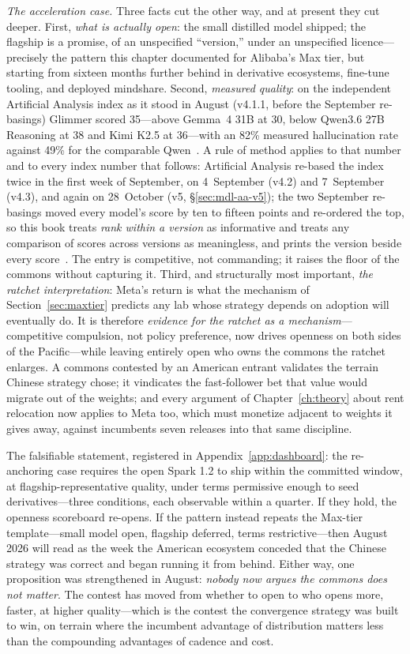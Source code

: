 \emph{The acceleration case.} Three facts cut the other way, and at present they cut deeper. First, \emph{what is actually open}: the small distilled model shipped; the flagship is a promise, of an unspecified ``version,'' under an unspecified licence---precisely the pattern this chapter documented for Alibaba's Max tier, but starting from sixteen months further behind in derivative ecosystems, fine-tune tooling, and deployed mindshare. Second, \emph{measured quality}: on the independent Artificial Analysis index as it stood in August (v4.1.1, before the September re-basings) Glimmer scored 35---above Gemma~4 31B at 30, below Qwen3.6 27B Reasoning at 38 and Kimi K2.5 at 36---with an 82\% measured hallucination rate against 49\% for the comparable Qwen~\cite{muse-aa}. A rule of method applies to that number and to every index number that follows: Artificial Analysis re-based the index twice in the first week of September, on 4~September (v4.2) and 7~September (v4.3), and again on 28~October (v5, \S\ref{sec:mdl-aa-v5}); the two September re-basings moved every model's score by ten to fifteen points and re-ordered the top, so this book treats \emph{rank within a version} as informative and treats any comparison of scores across versions as meaningless, and prints the version beside every score~\cite{aa-v43}. The entry is competitive, not commanding; it raises the floor of the commons without capturing it. Third, and structurally most important, \emph{the ratchet interpretation}: Meta's return is what the mechanism of Section~\ref{sec:maxtier} predicts any lab whose strategy depends on adoption will eventually do. It is therefore \emph{evidence for the ratchet as a mechanism}---competitive compulsion, not policy preference, now drives openness on both sides of the Pacific---while leaving entirely open who owns the commons the ratchet enlarges. A commons contested by an American entrant validates the terrain Chinese strategy chose; it vindicates the fast-follower bet that value would migrate out of the weights; and every argument of Chapter~\ref{ch:theory} about rent relocation now applies to Meta too, which must monetize adjacent to weights it gives away, against incumbents seven releases into that same discipline.

The falsifiable statement, registered in Appendix~\ref{app:dashboard}: the re-anchoring case requires the open Spark 1.2 to ship within the committed window, at flagship-representative quality, under terms permissive enough to seed derivatives---three conditions, each observable within a quarter. If they hold, the openness scoreboard re-opens. If the pattern instead repeats the Max-tier template---small model open, flagship deferred, terms restrictive---then August 2026 will read as the week the American ecosystem conceded that the Chinese strategy was correct and began running it from behind. Either way, one proposition was strengthened in August: \emph{nobody now argues the commons does not matter}. The contest has moved from whether to open to who opens more, faster, at higher quality---which is the contest the convergence strategy was built to win, on terrain where the incumbent advantage of distribution matters less than the compounding advantages of cadence and cost.

